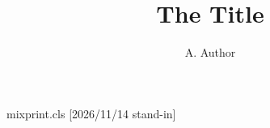 \begin{filecontents*}[overwrite]{mixprint.cls}
[2026/11/14 stand-in]
\renewcommand\title[1]{{\centering\Large #1\par}}
\renewcommand\maketitle{{\centering\@author\par}}
\end{filecontents*}
\documentclass{mixprint}

\title{The Title}
\author{A. Author}
Dated May 14th.
\maketitle
Body.

